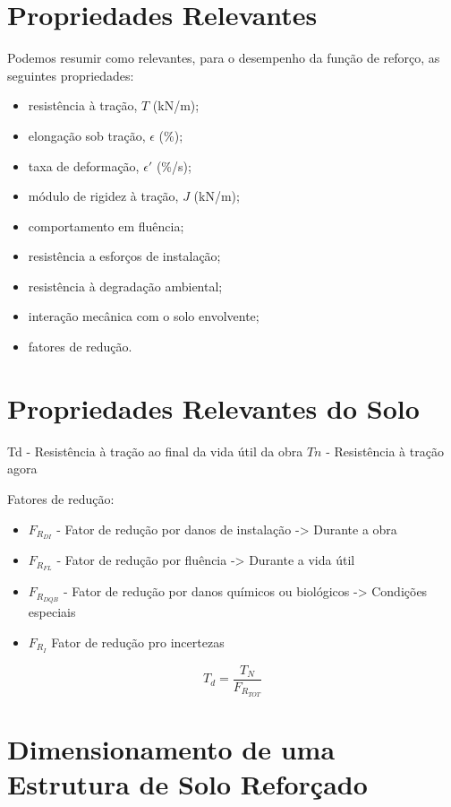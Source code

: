 \section{Propriedades Relevantes}

Podemos resumir como relevantes, para o desempenho da função de reforço, as seguintes propriedades:
\begin{itemize}
    \item resistência à tração, $T$ (kN/m);
    \item elongação sob tração, $\epsilon$ (\%);
    \item taxa de deformação, $\epsilon'$ (\%/s);
    \item módulo de rigidez à tração, $J$ (kN/m);
    \item comportamento em fluência;
    \item resistência a esforços de instalação;
    \item resistência à degradação ambiental;
    \item interação mecânica com o solo envolvente;
    \item fatores de redução.
\end{itemize}

\section{Propriedades Relevantes do Solo}

Td - Resistência à tração ao final da vida útil da obra
$Tn$ - Resistência à tração agora

Fatores de redução:
\begin{itemize}
    \item $F_{R_{DI}}$ - Fator de redução por danos de instalação -> Durante a obra
    \item $F_{R_{FL}}$ - Fator de redução por fluência -> Durante a vida útil
    \item $F_{R_{DQB}}$ - Fator de redução por danos químicos ou biológicos -> Condições especiais
    \item $F_{R_I}$ Fator de redução pro incertezas
\end{itemize}

\begin{equation}
    T_d = \frac{T_N}{F_{R_{TOT}}}
\end{equation}

\section{Dimensionamento de uma Estrutura de Solo Reforçado}

